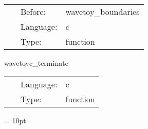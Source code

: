  \begin{tabular*}{160mm}{cll} 
~ & Before:  & wavetoy\_boundaries \\ 
~ & Language:  & c \\ 
~ & Type:  & function \\ 
\end{tabular*} 


\vspace{5mm}


\hspace{5mm} wavetoyc\_terminate 

\hspace{5mm}{\it tidy up } 


\hspace{5mm}

 \begin{tabular*}{160mm}{cll} 
~ & Language:  & c \\ 
~ & Type:  & function \\ 
\end{tabular*} 



\vspace{5mm}\parskip = 10pt 
